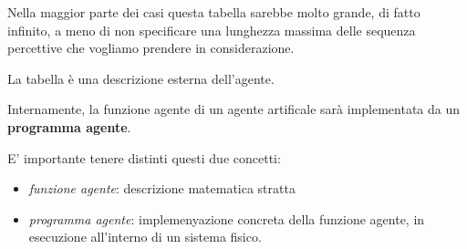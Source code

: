 \documentclass[a4paper, 12pt]{book}
\begin{document}
    Nella maggior parte dei casi questa tabella sarebbe molto grande, di fatto infinito, a meno di non specificare una lunghezza massima delle sequenza percettive che vogliamo prendere in considerazione.

    La tabella è una descrizione esterna dell'agente.

    Internamente, la funzione agente di un agente artificale sarà implementata da un \textbf{programma agente}.

    E' importante tenere distinti questi due concetti:
    \begin{itemize}
      \item \textit{funzione agente}: descrizione matematica stratta
      \item \textit{programma agente}: implemenyazione concreta della funzione agente, in esecuzione all'interno di un sistema fisico.
    \end{itemize}
\end{document}

